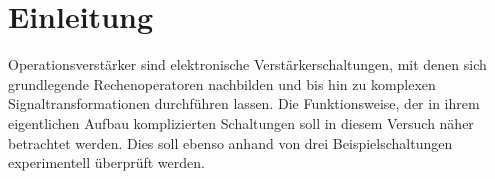 \section{Einleitung}
Operationsverstärker sind elektronische Verstärkerschaltungen, mit denen sich grundlegende Rechenoperatoren nachbilden und bis hin zu komplexen Signaltransformationen durchführen lassen. Die Funktionsweise, der in ihrem eigentlichen Aufbau komplizierten Schaltungen soll in diesem Versuch näher betrachtet werden. Dies soll ebenso anhand von drei Beispielschaltungen experimentell überprüft werden.
